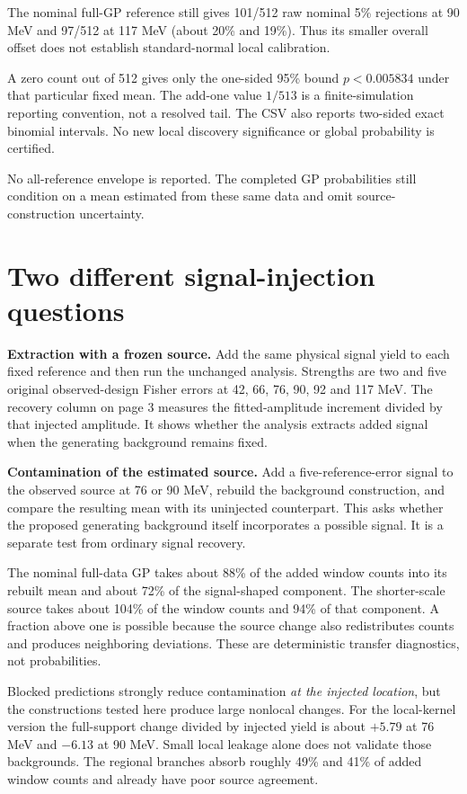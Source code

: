 \documentclass[11pt]{article}
\newcommand{\heading}[1]{\section*{\color{navy}#1}}
\begin{document}
The nominal full-GP reference still gives 101/512 raw nominal 5\% rejections at 90 MeV and 97/512 at 117 MeV (about 20\% and 19\%). Thus its smaller overall offset does not establish standard-normal local calibration.

A zero count out of 512 gives only the one-sided 95\% bound $p<0.005834$ under that particular fixed mean. The add-one value $1/513$ is a finite-simulation reporting convention, not a resolved tail. The CSV also reports two-sided exact binomial intervals. No new local discovery significance or global probability is certified.



No all-reference envelope is reported. The completed GP probabilities still condition on a mean estimated from these same data and omit source-construction uncertainty.

\clearpage
\heading{Two different signal-injection questions}
\textbf{Extraction with a frozen source.} Add the same physical signal yield to each fixed reference and then run the unchanged analysis. Strengths are two and five original observed-design Fisher errors at 42, 66, 76, 90, 92 and 117 MeV. The recovery column on page 3 measures the fitted-amplitude increment divided by that injected amplitude. It shows whether the analysis extracts added signal when the generating background remains fixed.

\textbf{Contamination of the estimated source.} Add a five-reference-error signal to the observed source at 76 or 90 MeV, rebuild the background construction, and compare the resulting mean with its uninjected counterpart. This asks whether the proposed generating background itself incorporates a possible signal. It is a separate test from ordinary signal recovery.



The nominal full-data GP takes about 88\% of the added window counts into its rebuilt mean and about 72\% of the signal-shaped component. The shorter-scale source takes about 104\% of the window counts and 94\% of that component. A fraction above one is possible because the source change also redistributes counts and produces neighboring deviations. These are deterministic transfer diagnostics, not probabilities.

Blocked predictions strongly reduce contamination \emph{at the injected location}, but the constructions tested here produce large nonlocal changes. For the local-kernel version the full-support change divided by injected yield is about $+5.79$ at 76 MeV and $-6.13$ at 90 MeV. Small local leakage alone does not validate those backgrounds. The regional branches absorb roughly 49\% and 41\% of added window counts and already have poor source agreement.
\end{document}
